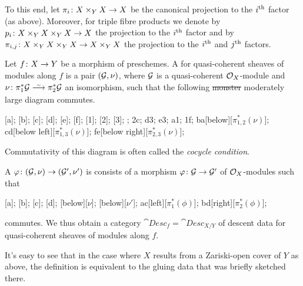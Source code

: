 \documentclass[a4paper,parskip=half,numbers=enddot, DIV=12]{scrreprt}
\begin{document}
 To this end, let $\pi_i\colon X\times_YX\morphism X$ be the canonical projection to the $i^{\text{th}}$ factor (as above). Moreover, for triple fibre products we denote by $p_i\colon X\times_YX\times_YX\morphism X$ the projection to the $i^{\text{th}}$ factor and by $\pi_{i,j}\colon X\times_YX\times_YX\morphism X\times_YX$ the projection to the $i^{\text{th}}$ and $j^{\text{th}}$ factors.
\begin{defi}
	Let $f\colon X\morphism Y$ be a morphism of preschemes. A  for quasi-coherent sheaves of modules along $f$ is a pair $(\mathcal{G},\nu)$, where $\mathcal{G}$ is a quasi-coherent $\mathcal{O}_X$-module and $\nu\colon \pi_1^*\Gg\isomorphism\pi_2^*\Gg$ an isomorphism, such that the following \sout{monster} moderately large diagram commutes.
	\begin{diagram*}
		[a];
		[b];
		[c];
		[d];
		[e];
		[f];
		[1];
		[2];
		[3];
		\scriptsize
		;
		\isoarrow2c;
		\isoarrow d3;
		\isoarrow e3;
		\isoarrow a1;
		\isoarrow 1f;
		\isoarrow ba[below][$\pi_{1,2}^*(\nu)$];
		\isoarrow cd[below left][$\pi_{1,3}^*(\nu)$];
		\isoarrow fe[below right][$\pi_{2,3}^*(\nu)$];
	\end{diagram*}
	Commutativity of this diagram is often called the \emph{cocycle condition}.
	
	A  $\phi\colon (\Gg,\nu)\morphism(\Gg',\nu')$ is consists of a morphism $\phi\colon \Gg\morphism\Gg'$ of $\mathcal{O}_X$-modules such that
	\begin{diagram*}
		\object{0,1.5}{$\pi_1^*\Gg$}[a];
		\object{2.5,1.5}{$\pi_2^*\Gg$}[b];
		\object{0,0}{$\pi_1^*\Gg'$}[c];
		\object{2.5,0}{$\pi_2^*\Gg'$}[d];
		\scriptsize
		[below][$\nu$];
		[below][$\nu'$];
		\arrow ac[left][$\pi_1^*(\phi)$];
		\arrow bd[right][$\pi_2^*(\phi)$];
	\end{diagram*}
	commutes. We thus obtain a category $\cat{Desc}_f=\cat{Desc}_{X/Y}$ of descent data for quasi-coherent sheaves of modules along $f$.
\end{defi}
\begin{rem}
	It's easy to see that in the case where $X$ results from a Zariski-open cover of $Y$ as above, the definition is equivalent to the gluing data that was briefly sketched there.
\end{rem}
\end{document}

